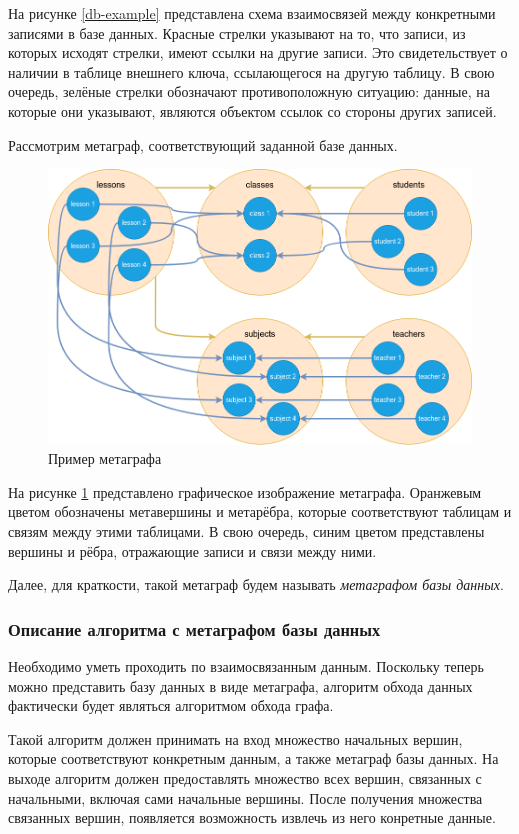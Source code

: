 На рисунке \ref{db-example} представлена схема взаимосвязей между конкретными записями в базе данных. Красные стрелки указывают на то, что записи, из которых исходят стрелки, имеют ссылки на другие записи. Это свидетельствует о наличии в таблице внешнего ключа, ссылающегося на другую таблицу. В свою очередь, зелёные стрелки обозначают противоположную ситуацию: данные, на которые они указывают, являются объектом ссылок со стороны других записей.

Рассмотрим метаграф, соответствующий заданной базе данных.

\begin{figure}
  \includegraphics[scale=0.5]{./img/drawio-metagraph-overview.png}
  \caption{Пример метаграфа}
  \label{metagraph-example}
\end{figure}

На рисунке \ref{metagraph-example} представлено графическое изображение метаграфа. Оранжевым цветом обозначены метавершины и метарёбра, которые соответствуют таблицам и связям между этими таблицами. В свою очередь, синим цветом представлены вершины и рёбра, отражающие записи и связи между ними.

Далее, для краткости, такой метаграф будем называть \textit{метаграфом базы данных}.

\subsubsection{Описание алгоритма с метаграфом базы данных}
Необходимо уметь проходить по взаимосвязанным данным. Поскольку теперь можно представить базу данных в виде метаграфа, алгоритм обхода данных фактически будет являться алгоритмом обхода графа.

Такой алгоритм должен принимать на вход множество начальных вершин, которые соответствуют конкретным данным, а также метаграф базы данных. На выходе алгоритм должен предоставлять множество всех вершин, связанных с начальными, включая сами начальные вершины. После получения множества связанных вершин, появляется возможность извлечь из него конретные данные.

